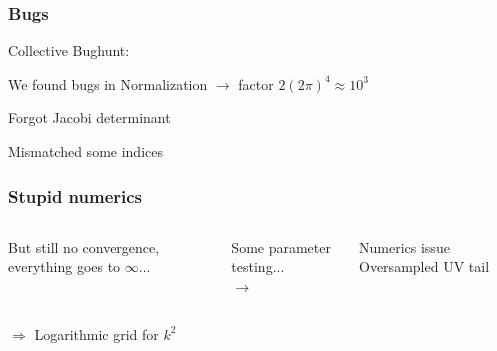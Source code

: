 \begin{frame}\frametitle{Bugs}
  {\Large Collective Bughunt:}


  {\small

    \pause
    \vspace{3mm}
    We found bugs in Normalization $\rightarrow$ factor $2(2\pi)^4 \approx 10^3$

    \pause
    \vspace{3mm}
    Forgot Jacobi determinant

    \pause
    \vspace{3mm}
    Mismatched some indices
  }
\end{frame}

\begin{frame}\frametitle{Stupid numerics}
  \begin{columns}
    \centering
    \begin{column}{0.4\linewidth}
      \begin{block}{}
        \vspace{-0.cm}
        But still no convergence, everything goes to $\infty$...
      \end{block}
    \end{column}
    \pause
    \begin{column}{0.2\linewidth}
      \centering
      {\tiny
        Some parameter testing...\\
      }
      $\rightarrow$
    \end{column}
    \pause
    \begin{column}{0.4\linewidth}
      \begin{block}{Numerics issue}
        \vspace{-0.cm}
          Oversampled UV tail
      \end{block}
    \end{column}
  \end{columns}
  \pause
  \vspace{1cm}
  \centering
  $\Rightarrow$ Logarithmic grid for $k^2$
\end{frame}

